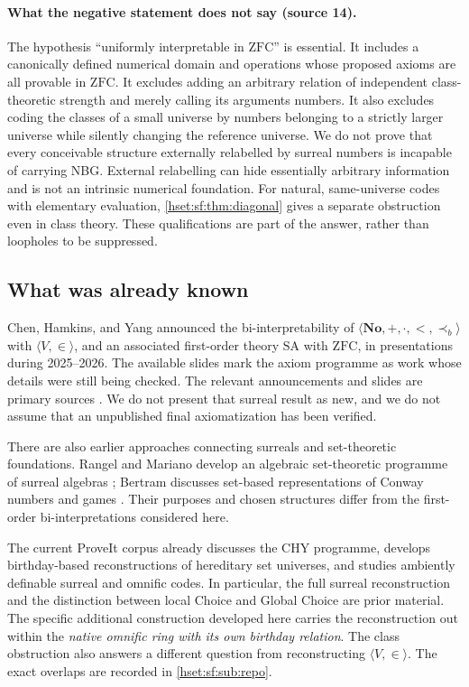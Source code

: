 \documentclass[11pt,letterpaper]{article}
\theoremstyle{definition}
\theoremstyle{remark}
\newcommand{\No}{\mathbf{No}}
\newcommand{\ZFC}{\mathrm{ZFC}}
\newcommand{\SAth}{\mathrm{SA}}
\newcommand{\precb}{\prec_b}
\begin{document}
\paragraph{What the negative statement does not say (source 14).} The hypothesis
``uniformly interpretable in $\ZFC$'' is essential. It includes a canonically
defined numerical domain and operations whose proposed axioms are all provable in
$\ZFC$. It excludes adding an arbitrary relation of independent class-theoretic
strength and merely calling its arguments numbers. It also excludes coding the
classes of a small universe by numbers belonging to a strictly larger universe
while silently changing the reference universe. We do not prove that every
conceivable structure externally relabelled by surreal numbers is incapable of
carrying NBG. External relabelling can hide essentially arbitrary information and
is not an intrinsic numerical foundation. For natural, same-universe codes with
elementary evaluation, \cref{hset:sf:thm:diagonal} gives a separate obstruction
even in class theory. These qualifications are part of the answer, rather than
loopholes to be suppressed.

\subsection{What was already known}
\label{hset:sf:sub:known}

Chen, Hamkins, and Yang announced the bi-interpretability of
$\langle\No,+,\cdot,<,\precb\rangle$ with $\langle V,\in\rangle$, and an
associated first-order theory $\SAth$ with $\ZFC$, in presentations during
2025--2026. The available slides mark the axiom programme as work whose details
were still being checked. The relevant announcements and slides are primary
sources \cite{CHYNotreDame,CHYCUNY}. We do not present that surreal result as
new, and we do not assume that an unpublished final axiomatization has been
verified.

There are also earlier approaches connecting surreals and set-theoretic
foundations. Rangel and Mariano develop an algebraic set-theoretic programme of
surreal algebras \cite{RM}; Bertram discusses set-based representations of
Conway numbers and games \cite{Bertram}. Their purposes and chosen structures
differ from the first-order bi-interpretations considered here.

The current ProveIt corpus already discusses the CHY programme, develops
birthday-based reconstructions of hereditary set universes, and studies ambiently
definable surreal and omnific codes. In particular, the full surreal
reconstruction and the distinction between local Choice and Global Choice are
prior material. The specific additional construction developed here carries the
reconstruction out within the \emph{native omnific ring with its own birthday
relation}. The class obstruction also answers a different question from
reconstructing $\langle V,\in\rangle$. The exact overlaps are recorded in
\cref{hset:sf:sub:repo}.
\end{document}
